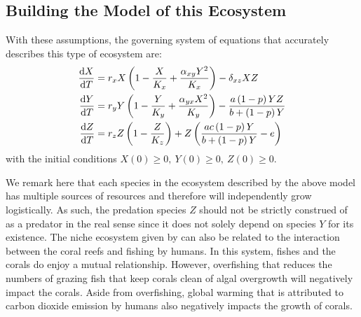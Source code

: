 \subsection{Building the Model of this Ecosystem}\label{subsec:building-the-model-of-this-ecosystem}
With these assumptions, the governing system of equations that accurately describes this type of ecosystem are:
\begin{subequations}\label{model:rayla-ephraim-d}
    \begin{align}
        \diff[]{X}{T} &= r_xX\left(1-\frac{X}{K_x}+\frac{\alpha_{xy}Y^2}{K_x}\right)-\delta_{xz}XZ
        \label{eq:rayla-ephraim-d-x}\\
        \diff[]{Y}{T} &= r_yY\left(1-\frac{Y}{K_y}+\frac{\alpha_{yx}X^2}{K_y}\right)-\frac{a\left(1-p\right)YZ}{b+\left(1-p\right)Y}
        \label{eq:rayla-ephraim-d-y}\\
        \diff[]{Z}{T} &= r_zZ\left(1-\frac{Z}{K_z}\right)+Z\left(\frac{ac\left(1-p\right)Y}{b+\left(1-p\right)Y}-e\right)
        \label{eq:rayla-ephraim-d-z}
    \end{align}
\end{subequations}
with the initial conditions $X(0)\geq 0,\ Y(0)\geq 0,\ Z(0)\geq 0$.

We remark here that each species in the ecosystem described by the above model has multiple sources of resources and therefore will independently grow logistically.
As such, the predation species $Z$ should not be strictly construed of as a predator in the real sense since it does not solely depend on species $Y$ for its existence.
The niche ecosystem given by  can also be related to the interaction between the coral reefs and fishing by humans.
In this system, fishes and the corals do enjoy a mutual relationship.
However, overfishing that reduces the numbers of grazing fish that keep corals clean of algal overgrowth will negatively impact the corals.
Aside from overfishing, global warming that is attributed to carbon dioxide emission by humans also negatively impacts the growth of corals.

